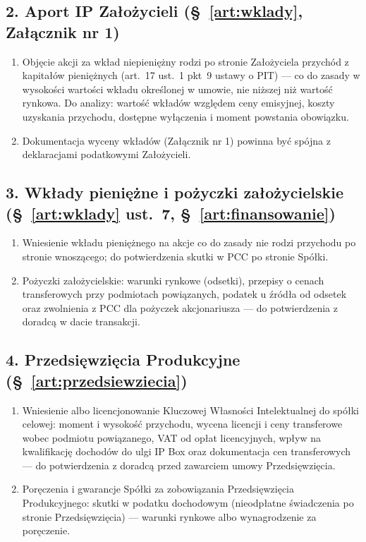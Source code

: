 \documentclass[12pt,a4paper]{report}
\begin{document}
\subsection*{2. Aport IP Założycieli (§~\ref{art:wklady}, Załącznik nr 1)}
\begin{enumerate}
  \item Objęcie akcji za wkład niepieniężny rodzi po stronie Założyciela przychód z kapitałów pieniężnych (art.~17 ust.~1 pkt~9 ustawy o PIT) --- co do zasady w wysokości wartości wkładu określonej w umowie, nie niższej niż wartość rynkowa. Do analizy: wartość wkładów względem ceny emisyjnej, koszty uzyskania przychodu, dostępne wyłączenia i moment powstania obowiązku.
  \item Dokumentacja wyceny wkładów (Załącznik nr 1) powinna być spójna z deklaracjami podatkowymi Założycieli.
\end{enumerate}

\subsection*{3. Wkłady pieniężne i pożyczki założycielskie (§~\ref{art:wklady} ust.~7, §~\ref{art:finansowanie})}
\begin{enumerate}
  \item Wniesienie wkładu pieniężnego na akcje co do zasady nie rodzi przychodu po stronie wnoszącego; do potwierdzenia skutki w PCC po stronie Spółki.
  \item Pożyczki założycielskie: warunki rynkowe (odsetki), przepisy o cenach transferowych przy podmiotach powiązanych, podatek u źródła od odsetek oraz zwolnienia z PCC dla pożyczek akcjonariusza --- do potwierdzenia z doradcą w dacie transakcji.
\end{enumerate}

\subsection*{4. Przedsięwzięcia Produkcyjne (§~\ref{art:przedsiewziecia})}
\begin{enumerate}
  \item Wniesienie albo licencjonowanie Kluczowej Własności Intelektualnej do spółki celowej: moment i wysokość przychodu, wycena licencji i ceny transferowe wobec podmiotu powiązanego, VAT od opłat licencyjnych, wpływ na kwalifikację dochodów do ulgi IP Box oraz dokumentacja cen transferowych --- do potwierdzenia z doradcą przed zawarciem umowy Przedsięwzięcia.
  \item Poręczenia i gwarancje Spółki za zobowiązania Przedsięwzięcia Produkcyjnego: skutki w podatku dochodowym (nieodpłatne świadczenia po stronie Przedsięwzięcia) --- warunki rynkowe albo wynagrodzenie za poręczenie.
\end{enumerate}
\end{document}
